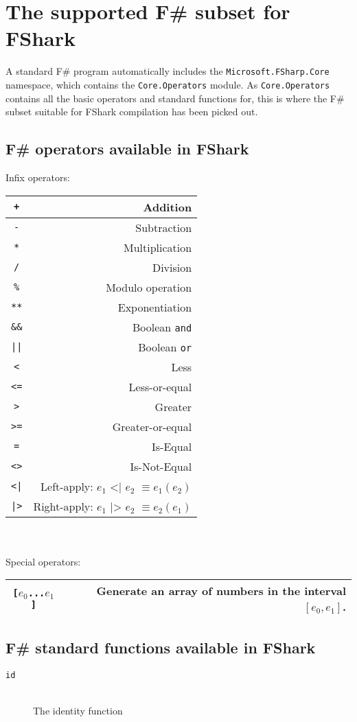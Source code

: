 \section{The supported F\# subset for FShark}
A standard F\# program automatically includes the \texttt{Microsoft.FSharp.Core}
namespace, which contains the \texttt{Core.Operators} module.
As \texttt{Core.Operators} contains all the basic operators and standard
functions for, this is where the F\# subset suitable for FShark compilation has
been picked out.

\subsection{F\# operators available in FShark}
Infix operators:\\
\begin{tabular}{|c|r|}
  \hline 
  \texttt{+} & Addition \\ \hline
  \texttt{-} & Subtraction \\ \hline
  \texttt{*} & Multiplication \\ \hline
  \texttt{/} & Division \\ \hline
  \texttt{\%} & Modulo operation \\ \hline
  \texttt{**} & Exponentiation \\ \hline
  \texttt{\&\&} & Boolean \texttt{and} \\ \hline
  \texttt{||} & Boolean \texttt{or} \\ \hline

  \texttt{<} & Less \\ \hline
  \texttt{<=} & Less-or-equal \\ \hline
  \texttt{>} & Greater \\ \hline
  \texttt{>=} & Greater-or-equal \\ \hline
  \texttt{=} & Is-Equal \\ \hline
  \texttt{<>} & Is-Not-Equal \\ \hline
  \texttt{<|} & Left-apply: $e_1 \texttt{ <| } e_2$ $\equiv e_1 (e_2)$ \\ \hline
  \texttt{|>} & Right-apply: $e_1 \texttt{ |> } e_2$ $\equiv e_2 (e_1)$ \\ \hline
\end{tabular}
\\
\\
Special operators:\\
\begin{tabular}{|c|r|}
  \hline 
  \texttt{[$e_0$...$e_1$]} & Generate an array of numbers in the interval $[e_0, e_1]$. \\ \hline
\end{tabular}



\subsection{F\# standard functions available in FShark}
\begin{description}
\item[\texttt{id}]\hfill\\
  The identity function
\end{description}
